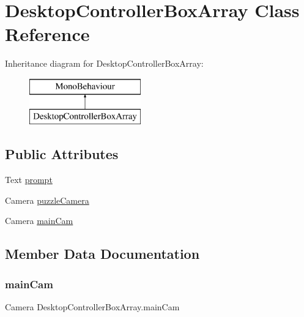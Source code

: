\hypertarget{class_desktop_controller_box_array}{}\section{Desktop\+Controller\+Box\+Array Class Reference}
\label{class_desktop_controller_box_array}
Inheritance diagram for Desktop\+Controller\+Box\+Array\+:\begin{figure}[H]
\begin{center}
\leavevmode
\includegraphics[height=2.000000cm]{class_desktop_controller_box_array}
\end{center}
\end{figure}
\subsection*{Public Attributes}
\begin{DoxyCompactItemize}
\item 
Text \hyperlink{class_desktop_controller_box_array_a947a69388f64d8e59d2836f0836a9538}{prompt}
\item 
Camera \hyperlink{class_desktop_controller_box_array_aceb8f6d6249766e34162daa8fb358b3a}{puzzle\+Camera}
\item 
Camera \hyperlink{class_desktop_controller_box_array_ab959c98f067c77ab701937bd5eb0b7b7}{main\+Cam}
\end{DoxyCompactItemize}


\subsection{Member Data Documentation}
\mbox{\label{class_desktop_controller_box_array_ab959c98f067c77ab701937bd5eb0b7b7}} 
\subsubsection{\texorpdfstring{main\+Cam}{mainCam}}
{\footnotesize\ttfamily Camera Desktop\+Controller\+Box\+Array.\+main\+Cam}

